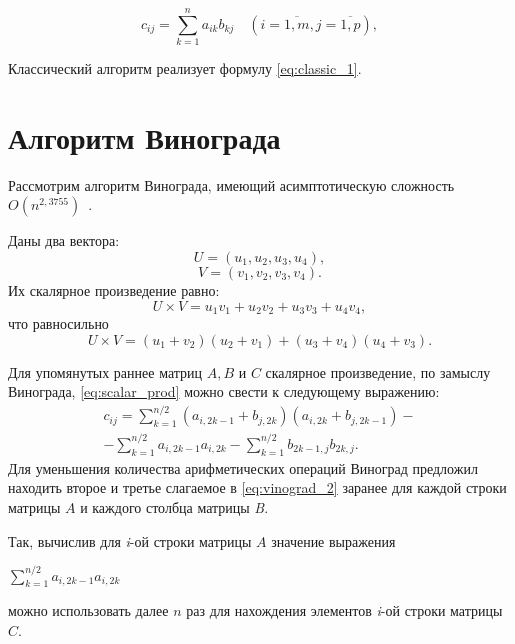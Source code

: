 \begin{equation}
    \label{eq:classic_1}
    c_{ij} = \sum_{k=1}^{n}a_{ik}b_{kj} \quad (i = \overline{1, m}, j = \overline{1, p}),
\end{equation}

Классический алгоритм реализует формулу \ref{eq:classic_1}.

\section{Алгоритм Винограда}
Рассмотрим алгоритм Винограда, имеющий асимптотическую сложность $O(n^{2,3755})$~\cite{vinograd-haskell}.

Даны два вектора:
\begin{equation}
    U = (u_{1}, u_{2}, u_{3}, u_{4}),
\end{equation}
\begin{equation}
    V = (v_{1}, v_{2}, v_{3}, v_{4}).
\end{equation}
Их скалярное произведение равно:
\begin{equation}
    \label{eq:scalar_prod}
    U \times V = u_{1}v_{1} + u_{2}v_{2} + u_{3}v_{3} + u_{4}v_{4},
\end{equation}
что равносильно
\begin{equation}
    \label{eq:vinograd_1}
    U \times V = (u_{1} + v_{2})(u_{2} + v_{1}) + (u_{3} + v_{4})(u_{4} + v_{3}).
\end{equation}

Для упомянутых раннее матриц $A, B$ и $C$ скалярное произведение, по замыслу Винограда, \ref{eq:scalar_prod} можно свести к следующему выражению:
\begin{multline}
    \label{eq:vinograd_2}
    c_{ij} = \sum_{k = 1}^{n / 2}(a_{i,2k - 1} + b_{j, 2k})(a_{i,2k} + b_{j, 2k - 1}) - \\ - \sum_{k = 1}^{n / 2}a_{i,2k - 1}a_{i,2k} - \sum_{k = 1}^{n / 2}b_{2k - 1,j}b_{2k,j}.
\end{multline}
Для уменьшения количества арифметических операций Виноград предложил находить второе и третье слагаемое в \ref{eq:vinograd_2} заранее для каждой строки матрицы $A$ и каждого столбца матрицы \textit{B}.

Так, вычислив для \textit{i}-ой строки матрицы $A$ значение выражения

$\sum_{k = 1}^{n / 2}a_{i,2k - 1}a_{i,2k}$

можно использовать далее $n$ раз для нахождения элементов \textit{i}-ой строки матрицы $C$.  

